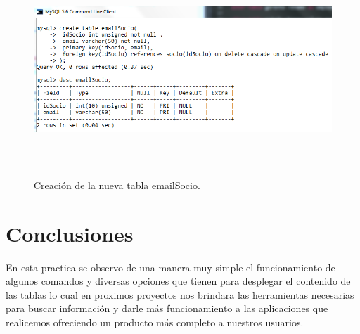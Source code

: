\documentclass[12pt, titlepage]{article}
\begin{document}
\begin{figure}[H]
    \begin{center}
        \includegraphics[width=15cm, height=8cm]{img/email-socio.png}
        \caption{Creación de la nueva tabla emailSocio.}
        \label{fig:arlter15}
    \end{center}
\end{figure}
    \section{Conclusiones}
        En esta practica se observo de una manera muy simple el funcionamiento de algunos comandos y diversas opciones que tienen para desplegar el contenido de las tablas lo cual en proximos proyectos nos brindara las herramientas necesarias para buscar información y darle más funcionamiento a las aplicaciones que realicemos ofreciendo un producto más completo a nuestros usuarios.
     
    
\end{document}
